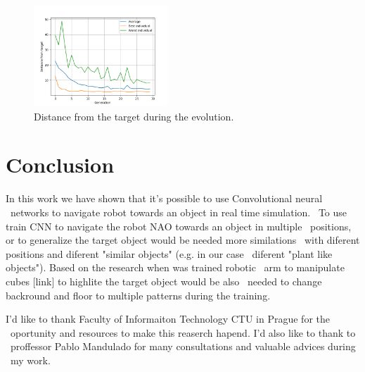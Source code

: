 \documentclass[twocolumn,10pt]{asme2ej}
\begin{document}
\begin{figure}[ht]
    \includegraphics[width=0.45\textwidth]{evolution.png}
    \caption{Distance from the target during the evolution.}
\end{figure}

\section{Conclusion}
In this work we have shown that it's possible to use Convolutional neural \
networks to navigate robot towards an object in real time simulation. \
To use train CNN to navigate the robot NAO towards an object in multiple \
positions, or to generalize the target object would be needed more similations \
with diferent positions and diferent "similar objects" (e.g. in our case \
diferent "plant like objects"). Based on the research when was trained robotic \
arm to manipulate cubes [link] to highlite the target object would be also \
needed to change backround and floor to multiple patterns during the training.

\begin{acknowledgment}
I'd like to thank Faculty of Informaiton Technology CTU in Prague for the \
oportunity and resources to make this reaserch hapend. I'd also like to thank to \
proffessor Pablo Mandulado for many consultations and valuable advices during \
my work.
\end{acknowledgment}



\end{document}
